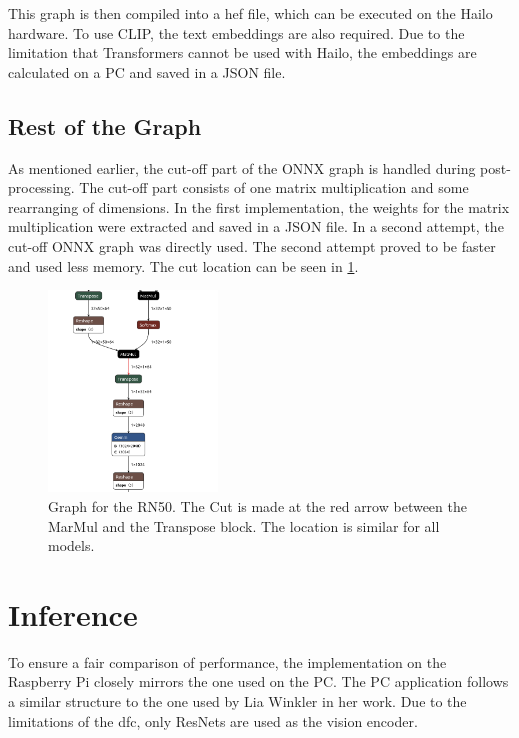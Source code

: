 This graph is then compiled into a \acrshort{hef} file, which can be executed on the Hailo hardware.
To use CLIP, the text embeddings are also required.
Due to the limitation that Transformers cannot be used with Hailo, the embeddings are calculated on a PC and saved in a JSON file.

\subsection{Rest of the Graph}

As mentioned earlier, the cut-off part of the ONNX graph is handled during post-processing. 
The cut-off part consists of one matrix multiplication and some rearranging of dimensions. 
In the first implementation, the weights for the matrix multiplication were extracted and saved in a JSON file.
In a second attempt, the cut-off ONNX graph was directly used.
The second attempt proved to be faster and used less memory.
The cut location can be seen in \cref{fig:implementation:RNcut}.

\begin{figure}
    \centering
    \includegraphics[width=0.4\textwidth]{Images/Implementation/firstcutlocation.png}
    \caption{Graph for the RN50. The Cut is made at the red arrow between the MarMul and the Transpose block.
    The location is similar for all models.}
    \label{fig:implementation:RNcut}
\end{figure}
\section{Inference}

To ensure a fair comparison of performance, the implementation on the Raspberry Pi closely mirrors the one used on the PC. 
The PC application follows a similar structure to the one used by Lia Winkler in her work.
Due to the limitations of the \acrshort{dfc}, only ResNets are used as the vision encoder.

